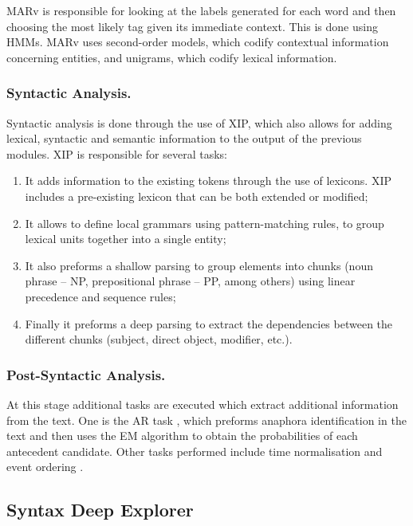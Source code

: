 \ac{MARv} is responsible for looking at the labels generated for each word
and then choosing the most likely tag given its immediate context. This is done
using \acp{HMM}. \ac{MARv} uses second-order models, which codify contextual
information concerning entities, and unigrams, which codify lexical information.

\subsubsection*{Syntactic Analysis.}

Syntactic analysis is done through the use of \ac{XIP}, which also allows for
adding lexical, syntactic and semantic information to the output of the
previous modules. \ac{XIP} is responsible for several tasks:

\begin{enumerate}[label=(\roman*)]
 \item It adds information to the existing tokens through the use of lexicons.
\ac{XIP} includes a pre-existing lexicon that can be both extended or modified;
 \item It allows to define local grammars using pattern-matching rules, to group
lexical units together into a single entity;
 \item It also preforms a shallow parsing to group elements into chunks (noun
 phrase -- NP, prepositional phrase -- PP, among others) using linear precedence
 and sequence rules;
 \item Finally it preforms a deep parsing to extract the dependencies between the
different chunks (subject, direct object, modifier, etc.).
\end{enumerate}

\subsubsection*{Post-Syntactic Analysis.}

At this stage additional tasks are executed which extract additional information
from the text. One is the \ac{AR} task \cite{marques2013anaphora}, which
preforms anaphora identification in the text and then uses the \ac{EM} algorithm
to obtain the probabilities of each antecedent candidate. Other tasks performed
include time normalisation \cite{mauricio2011normalizacao} and event ordering
\cite{cabrita2014ordenar}.

\subsection{Syntax Deep Explorer}

